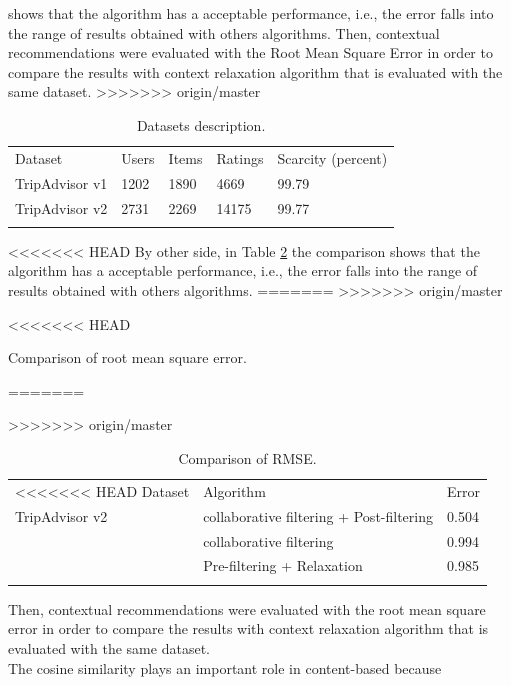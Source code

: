 shows that the algorithm has a acceptable performance, i.e., the error
falls into the range of results obtained with others algorithms. Then,
contextual recommendations were evaluated with the Root Mean Square
Error in order to compare the results with context relaxation
algorithm\cite{zheng2012differential} that is evaluated with the same
dataset.
>>>>>>> origin/master
\begin{table}
\centering
\small
\captionsetup{font=footnotesize}
\caption{Datasets description.}
\label{tab:3}      
\begin{tabular}{lllll}
\hline\noalign{\smallskip}
Dataset & Users & Items & Ratings & Scarcity (percent) \\
\noalign{\smallskip}\hline\noalign{\smallskip}
TripAdvisor v1 & 1202 & 1890 & 4669 & 99.79 \\
TripAdvisor v2 & 2731 & 2269 & 14175 & 99.77 \\
\noalign{\smallskip}\hline
\end{tabular}
\end{table}
<<<<<<< HEAD
By other side, in Table  \ref{tab:4} the comparison
shows that the algorithm has a acceptable performance, i.e., the error
falls into the range of results obtained with others algorithms. 
=======
>>>>>>> origin/master
\begin{table}
\centering
\small
\captionsetup{font=footnotesize}
<<<<<<< HEAD
\caption{Comparison of root mean square error.}
=======
\caption{Comparison of RMSE.}
>>>>>>> origin/master
\label{tab:4}  
\small   
\begin{tabular}{lll}
\hline\noalign{\smallskip}
<<<<<<< HEAD
Dataset & Algorithm & Error \\
\noalign{\smallskip}\hline\noalign{\smallskip}
TripAdvisor v2 & collaborative filtering + Post-filtering  & 0.504  \\
                        & collaborative filtering                           & 0.994  \\
                        & Pre-filtering + Relaxation                     & 0.985  \\
\noalign{\smallskip}\hline
\end{tabular}
\end{table}
Then, contextual recommendations were evaluated with the 
root mean square error in order to compare the results with context 
relaxation algorithm  \cite{zheng2012differential} that is evaluated 
with the same dataset.\\ 
The cosine similarity plays an important role in content-based because
